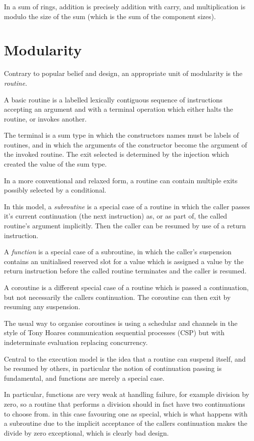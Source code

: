\documentclass[oneside]{book}
\theoremstyle{plain}
\theoremstyle{definition}
\theoremstyle{plain}
\begin{document}
In a sum of rings, addition is precisely addition with carry,
and multiplication is modulo the size of the sum (which is the
sum of the component sizes).

\chapter{Modularity}
Contrary to popular belief and design, an appropriate unit of modularity
is the {\em routine.}

A basic routine is a labelled lexically contiguous sequence of instructions
accepting an argument and with a terminal operation which either halts
the routine, or invokes another.

The terminal is a sum type in which the constructors names must be labels
of routines, and in which the arguments of the constructor become the
argument of the invoked routine.  The exit selected is determined by
the injection which created the value of the sum type.

In a more conventional and relaxed form, a routine can contain multiple
exits possibly selected by a conditional.

In this model, a {\em subroutine} is a special case of a routine in which
the caller passes it's current continuation (the next instruction) as, or as
part of, the called routine's argument implicitly. Then the caller can be resumed
by use of a return instruction.

A {\em function} is a special case of a subroutine, in which the caller's suspension
contains an unitialised reserved slot for a value which is assigned a value
by the return instruction before the called routine terminates and the caller
is resumed.

A coroutine is a different special case of a routine which is passed a continuation,
but not necessarily the callers continuation. The coroutine can then exit by
resuming any suspension.

The usual way to organise coroutines is using a schedular and channels in the style
of Tony Hoares communication sequential processes (CSP) but with indeterminate
evaluation replacing concurrency.

Central to the execution model is the idea that a routine can suspend itself,
and be resumed by others, in particular the notion of continuation passing
is fundamental, and functions are merely a special case.

In particular, functions are very weak at handling failure, for example
division by zero, so a routine that performs a division should in fact
have two continuations to choose from.  in this case favouring one
as special, which is what happens with a subroutine due to the implicit
acceptance of the callers continuation makes the divide by zero exceptional,
which is clearly bad design.
\end{document}
